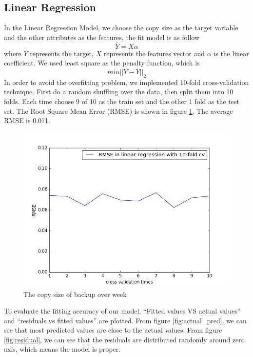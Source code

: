\documentclass{article}
\begin{document}
\subsection{Linear Regression}
In the Linear Regression Model, we choose the copy size as the target variable and the other attributes as the features, the fit model is as follow
\begin{equation*}
\bar{Y} = X\alpha
\end{equation*}
where $\bar{Y}$ represents the target, $X$ represents the features vector and $\alpha$ is the linear coefficient. We used least square as the penalty function, which is
\begin{equation*}
min || Y - \bar{Y} ||_2
\end{equation*}
In order to avoid the overfitting problem, we implemented 10-fold cross-validation technique. First do a random shuffling over the data, then split them into 10 folds. Each time choose 9 of 10 as the train set and the other 1 fold as the test set. The Root Square Mean Error (RMSE) is shown in figure \ref{fig:rmse_lr}. The average RMSE is 0.071.
\begin{figure}[htbp]
\centering
\includegraphics[width=.6\textwidth]{rmse_linear.png}
\caption{The copy size of backup over week}
\label{fig:rmse_lr}
\end{figure}
To evaluate the fitting accuracy of our model, “Fitted values VS actual values” and “residuals vs fitted values” are plotted. From figure \ref{fig:actual_pred}, we can see that most predicted values are close to the actual values. From figure \ref{fig:residual}, we can see that the residuals are distributed randomly around zero axis, which means the model is proper.\\
\end{document}
